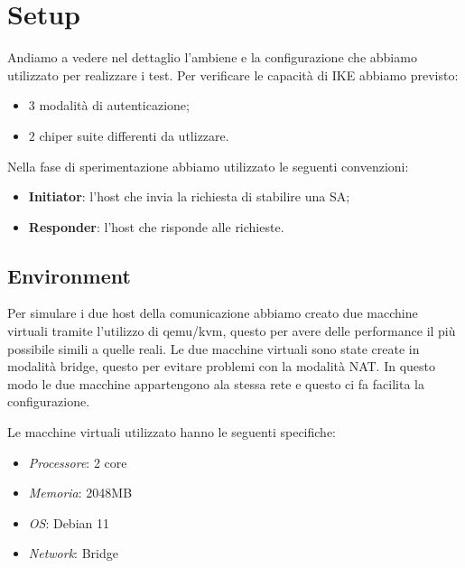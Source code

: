 \documentclass[
10pt, %
a4paper, %
oneside, %
headinclude,footinclude, %
BCOR5mm, %
]{scrartcl}
\begin{document}

\newpage

\section{Setup}

Andiamo a vedere nel dettaglio l'ambiene e la configurazione che abbiamo utilizzato per realizzare i test. Per verificare le capacità di IKE abbiamo previsto:
\begin{itemize}
    \item $3$ modalità di autenticazione;
    \item $2$ chiper suite differenti da utlizzare.
\end{itemize}

\noindent
Nella fase di sperimentazione abbiamo utilizzato le seguenti convenzioni:
\begin{itemize}
    \item \textbf{Initiator}: l'host che invia la richiesta di stabilire una SA;
    \item \textbf{Responder}: l'host che risponde alle richieste.
\end{itemize}


\subsection{Environment}

Per simulare i due host della comunicazione abbiamo creato due macchine virtuali tramite l'utilizzo di qemu/kvm, questo per avere 
delle performance il più possibile simili a quelle reali. Le due macchine virtuali sono state create in modalità bridge, questo per evitare problemi con la modalità NAT. In questo modo
le due macchine appartengono ala stessa rete e questo ci fa facilita la configurazione.

\noindent
Le macchine virtuali utilizzato hanno le seguenti specifiche:

\begin{itemize}
    \item \textit{Processore}: 2 core
    \item \textit{Memoria}: 2048MB
    \item \textit{OS}: Debian 11
    \item \textit{Network}: Bridge
\end{itemize}
\end{document}
